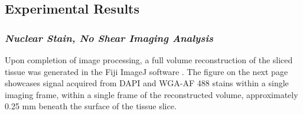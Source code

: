 \subsection{Experimental Results}
\subsubsection{\textit{Nuclear Stain, No Shear Imaging Analysis}}

Upon completion of image processing, a full volume reconstruction of the sliced tissue was generated in the Fiji ImageJ software \cite{schindelin_fiji_2012}. The figure on the next page showcases signal acquired from DAPI and WGA-AF 488 stains within a single imaging frame, within a single frame of the reconstructed volume, approximately 0.25 mm beneath the surface of the tissue slice.

